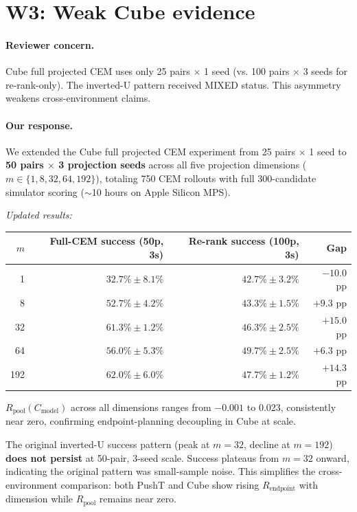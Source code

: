 \documentclass[11pt]{article}
\newcommand{\Rendpoint}{R_{\mathrm{endpoint}}}
\newcommand{\Rpool}{R_{\mathrm{pool}}}
\newcommand{\Cmodel}{C_{\mathrm{model}}}
\begin{document}
\section*{W3: Weak Cube evidence}

\paragraph{Reviewer concern.}
Cube full projected CEM uses only 25 pairs $\times$ 1 seed (vs. 100 pairs $\times$ 3 seeds for re-rank-only). The inverted-U pattern received MIXED status. This asymmetry weakens cross-environment claims.

\paragraph{Our response.}
We extended the Cube full projected CEM experiment from 25 pairs $\times$ 1 seed to \textbf{50 pairs $\times$ 3 projection seeds} across all five projection dimensions ($m \in \{1, 8, 32, 64, 192\}$), totaling 750 CEM rollouts with full 300-candidate simulator scoring ($\sim$10 hours on Apple Silicon MPS).

\textit{Updated results:}

\begin{center}
\begin{tabular}{rrrr}
\toprule
$m$ & Full-CEM success (50p, 3s) & Re-rank success (100p, 3s) & Gap \\
\midrule
1 & $32.7\% \pm 8.1\%$ & $42.7\% \pm 3.2\%$ & $-10.0$ pp \\
8 & $52.7\% \pm 4.2\%$ & $43.3\% \pm 1.5\%$ & $+9.3$ pp \\
32 & $61.3\% \pm 1.2\%$ & $46.3\% \pm 2.5\%$ & $+15.0$ pp \\
64 & $56.0\% \pm 5.3\%$ & $49.7\% \pm 2.5\%$ & $+6.3$ pp \\
192 & $62.0\% \pm 6.0\%$ & $47.7\% \pm 1.2\%$ & $+14.3$ pp \\
\bottomrule
\end{tabular}
\end{center}

$\Rpool(\Cmodel)$ across all dimensions ranges from $-0.001$ to 0.023, consistently near zero, confirming endpoint-planning decoupling in Cube at scale.

The original inverted-U success pattern (peak at $m=32$, decline at $m=192$) \textbf{does not persist} at 50-pair, 3-seed scale. Success plateaus from $m=32$ onward, indicating the original pattern was small-sample noise. This simplifies the cross-environment comparison: both PushT and Cube show rising $\Rendpoint$ with dimension while $\Rpool$ remains near zero.
\end{document}
